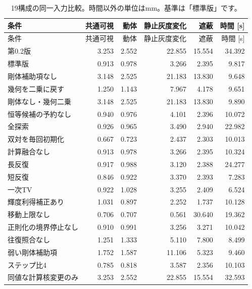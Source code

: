 \begingroup\small
\setlength{\tabcolsep}{4pt}
\begin{longtable}{lrrrrr}
\caption{19構成の同一入力比較。時間以外の単位はmm。基準は「標準版」です。}\\
\toprule
条件 & 共通可視 & 動体 & 静止灰度変化 & 遮蔽 & 時間 [s]\\\midrule\endfirsthead
\toprule
条件 & 共通可視 & 動体 & 静止灰度変化 & 遮蔽 & 時間 [s]\\\midrule\endhead
\bottomrule\endfoot
第0.2版 & 3.253 & 2.552 & 22.855 & 15.554 & 34.392\\
標準版 & 0.913 & 0.978 & 3.266 & 2.395 & 9.817\\
剛体補助項なし & 3.148 & 2.525 & 21.183 & 13.830 & 9.648\\
幾何を二乗に戻す & 1.250 & 1.143 & 7.967 & 4.178 & 9.651\\
剛体なし・幾何二乗 & 3.148 & 2.525 & 21.183 & 13.830 & 9.890\\
恒等候補の予約なし & 0.940 & 0.976 & 4.101 & 2.396 & 10.072\\
全探索 & 0.926 & 0.965 & 3.490 & 2.940 & 22.982\\
双対を毎回初期化 & 0.667 & 0.723 & 2.437 & 2.303 & 10.013\\
計算融合なし & 0.913 & 0.978 & 3.266 & 2.395 & 10.324\\
長反復 & 0.917 & 0.988 & 3.120 & 2.388 & 24.277\\
短反復 & 0.846 & 0.922 & 3.370 & 2.393 & 7.283\\
一次TV & 0.922 & 1.028 & 3.255 & 2.409 & 6.524\\
輝度利得補正あり & 1.031 & 0.897 & 2.252 & 1.737 & 10.128\\
移動上限なし & 0.706 & 0.707 & 0.561 & 30.640 & 19.362\\
正則化の境界停止なし & 0.910 & 0.991 & 3.256 & 3.271 & 10.042\\
往復照合なし & 1.251 & 1.333 & 5.110 & 7.800 & 8.499\\
弱い剛体補助項 & 1.752 & 1.587 & 11.106 & 5.323 & 9.460\\
ステップ比4 & 0.785 & 0.818 & 3.587 & 2.356 & 10.103\\
同値な計算核変更のみ & 3.253 & 2.552 & 22.855 & 15.554 & 32.593\\
\end{longtable}
\endgroup
